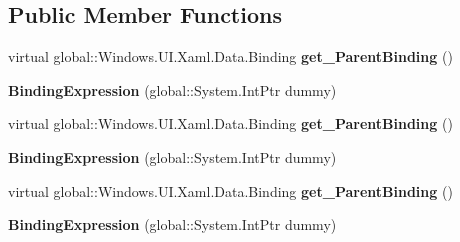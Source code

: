 \subsection*{Public Member Functions}
\begin{DoxyCompactItemize}
\item 
\mbox{\label{class_windows_1_1_u_i_1_1_xaml_1_1_data_1_1_binding_expression_a1622dda669d5faadbff83a584135fa04}} 
virtual global\+::\+Windows.\+U\+I.\+Xaml.\+Data.\+Binding {\bfseries get\+\_\+\+Parent\+Binding} ()
\item 
\mbox{\label{class_windows_1_1_u_i_1_1_xaml_1_1_data_1_1_binding_expression_a52ea6871517ce801ff1319a1b8a6dac9}} 
{\bfseries Binding\+Expression} (global\+::\+System.\+Int\+Ptr dummy)
\item 
\mbox{\label{class_windows_1_1_u_i_1_1_xaml_1_1_data_1_1_binding_expression_a1622dda669d5faadbff83a584135fa04}} 
virtual global\+::\+Windows.\+U\+I.\+Xaml.\+Data.\+Binding {\bfseries get\+\_\+\+Parent\+Binding} ()
\item 
\mbox{\label{class_windows_1_1_u_i_1_1_xaml_1_1_data_1_1_binding_expression_a52ea6871517ce801ff1319a1b8a6dac9}} 
{\bfseries Binding\+Expression} (global\+::\+System.\+Int\+Ptr dummy)
\item 
\mbox{\label{class_windows_1_1_u_i_1_1_xaml_1_1_data_1_1_binding_expression_a1622dda669d5faadbff83a584135fa04}} 
virtual global\+::\+Windows.\+U\+I.\+Xaml.\+Data.\+Binding {\bfseries get\+\_\+\+Parent\+Binding} ()
\item 
\mbox{\label{class_windows_1_1_u_i_1_1_xaml_1_1_data_1_1_binding_expression_a52ea6871517ce801ff1319a1b8a6dac9}} 
{\bfseries Binding\+Expression} (global\+::\+System.\+Int\+Ptr dummy)
\item 
\mbox{\label{class_windows_1_1_u_i_1_1_xaml_1_1_data_1_1_binding_expression_a1622dda669d5faadbff83a584135fa04}} 

\end{DoxyCompactItemize}
